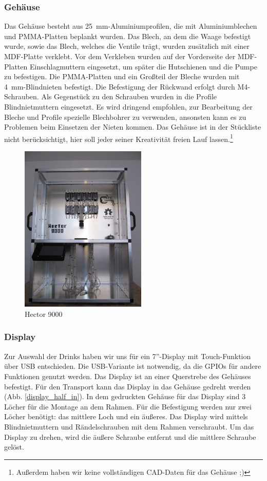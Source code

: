 \documentclass[a4paper]{scrartcl}
\begin{document}
\subsubsection{Gehäuse}
Das Gehäuse besteht aus \SI{25}{\milli\metre}-Aluminiumprofilen, die mit Aluminiumblechen und PMMA-Platten beplankt wurden. Das Blech, an dem die Waage befestigt wurde, sowie das Blech, welches die Ventile trägt, wurden zusätzlich mit einer MDF-Platte verklebt. Vor dem Verkleben wurden auf der Vorderseite der MDF-Platten Einschlagmuttern eingesetzt, um später die Hutschienen und die Pumpe zu befestigen. Die PMMA-Platten und ein Großteil der Bleche wurden mit \SI{4}{\milli\metre}-Blindnieten befestigt. Die Befestigung der Rückwand erfolgt durch M4-Schrauben. Als Gegenstück zu den Schrauben wurden in die Profile Blindnietmuttern eingesetzt. Es wird dringend empfohlen, zur Bearbeitung der Bleche und Profile spezielle Blechbohrer zu verwenden, ansonsten kann es zu Problemen beim Einsetzen der Nieten kommen. Das Gehäuse ist in der Stückliste nicht berücksichtigt, hier soll jeder seiner Kreativität freien Lauf lassen.\footnote{Außerdem haben wir keine vollständigen CAD-Daten für das Gehäuse ;)}

\begin{figure}
  \centering
  \includegraphics[height=8cm]{pics/hector9000.JPG}
  \caption{Hector 9000} \label{hector9000}
\end{figure}

\subsubsection{Display}
Zur Auswahl der Drinks haben wir uns für ein 7''-Display mit Touch-Funktion über USB entschieden. Die USB-Variante ist notwendig, da die GPIOs für andere Funktionen genutzt werden. Das Display ist an einer Querstrebe des Gehäuses befestigt. Für den Transport kann das Display in das Gehäuse gedreht werden (Abb. \ref{display_half_in}). In dem gedruckten Gehäuse für das Display sind 3 Löcher für die Montage an dem Rahmen. Für die Befestigung werden nur zwei Löcher benötigt: das mittlere Loch und ein äußeres. Das Display wird mittels Blindnietmuttern und Rändelschrauben mit dem Rahmen verschraubt. Um das Display zu drehen, wird die äußere Schraube entfernt und die mittlere Schraube gelöst. 
\end{document}
